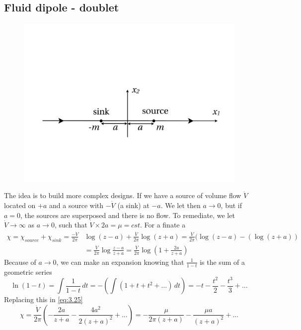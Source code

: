 	\subsection{Fluid dipole - doublet}
		\begin{figure}
		\vspace{0mm}	
		\includegraphics[scale=0.2]{ch3/4}	
		\end{figure}
		The idea is to build more complex designs. If we have a source of volume flow $\dot{V}$ located on $+a$ and a source with $-\dot{V}$ (a sink) at $-a$. We let then $a\rightarrow 0$, but if $a=0$, the sources are superposed and there is no flow. To remediate, we let $\dot{V}\rightarrow \infty$ as $a\rightarrow 0$, such that $\dot{V}\times 2a= \mu = cst$. For a finate a 
		\begin{equation}
		\begin{aligned}
			\chi = \chi _{source} + \chi _{sink} = \frac{-\dot{V}}{2\pi}&\log (z-a) + \frac{\dot{V}}{2\pi}\log (z+a) = \frac{\dot{V}}{2\pi} (\log (z-a) - (\log (z+a))\\
			 &= \frac{\dot{V}}{2\pi} \log \frac{z-a}{z+a} = \frac{\dot{V}}{2\pi} \log \left( 1+ \frac{2a}{z+a} \right)
		\end{aligned}
		\label{eq:3.25}
		\end{equation}
		Because of $a\rightarrow 0$, we can make an expansion knowing that $\frac{1}{1-t}$ is the sum of a geometric series 
		\begin{equation}
			\ln (1-t) = \int \frac{1}{1-t} \, dt = - \left( \int (1+t+t^2+...) \, dt \right) = -t-\frac{t^2}{2}-\frac{t^3}{3}+... 
		\end{equation}
		Replacing this in \eqref{eq:3.25}
		\begin{equation}
			\chi = \frac{\dot{V}}{2\pi} \left(- \frac{2a}{z+a}- \frac{4a^2}{2(z+a)^2} + ... \right) = -\frac{\mu}{2\pi(z+a)}-\frac{\mu a}{(z+a)^2}+ ...
		\end{equation}


